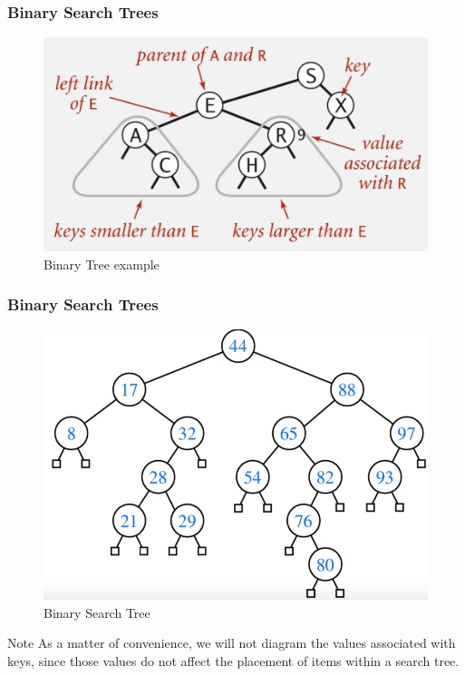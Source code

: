 \documentclass[11pt]{beamer}
\begin{document}
     \begin{frame}
    	\frametitle{Binary Search Trees}
     \begin{figure}
    	\centering
    	\includegraphics[width=0.9\linewidth]{"Screenshot 2020-11-02 at 10.08.12 AM"}
    	\caption{Binary Tree example}
    	\label{fig:screenshot-2020-11-02-at-10}
    \end{figure}
    \end{frame}
  
   
     \begin{frame}
    	\frametitle{Binary Search Trees}
    	\begin{figure}
    		\centering
    		\includegraphics[width=0.5\linewidth]{"Screenshot 2020-11-02 at 10.01.34 AM"}
    		\caption{Binary Search Tree}
    		\label{fig:screenshot-2020-11-02-at-10}
    	\end{figure}
    	\begin{alertblock}{Note}
    		As a matter of convenience, we will not diagram the values associated with keys, since those values do not affect the placement of items within a search tree.
    	\end{alertblock}
    \end{frame}
    
\end{document}
